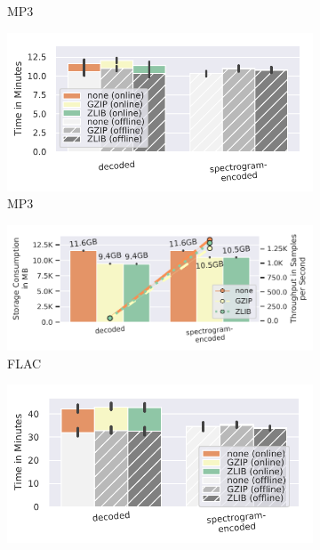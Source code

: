 {\begin{figure}
\begin{subfigure}[c]{0.26\textwidth}
        \vspace{-18pt}
        \caption{MP3}
        \label{fig:compressed-storage-vs-throughput-mp3}
    \end{subfigure}
        \begin{subfigure}[c]{0.21\textwidth}
        \includegraphics[width=\textwidth]{figures/commonvoice-pipeline/compression-processing-time-split.pdf}
        \vspace{-18pt}
        \caption{MP3}
        \label{fig:compressed-processing-time-mp3}
    \end{subfigure}    
    \begin{subfigure}[c]{0.26\textwidth}
        \includegraphics[width=\textwidth]{figures/librispeech-pipeline/compressed-storage-vs-throughput.pdf}
        \vspace{-18pt}
        \caption{FLAC}
        \label{fig:compressed-storage-vs-throughput-flac}
    \end{subfigure}
    \begin{subfigure}[c]{0.21\textwidth}
        \includegraphics[width=\textwidth]{figures/librispeech-pipeline/compression-processing-time-split.pdf}

\end{subfigure}
\end{figure}}
